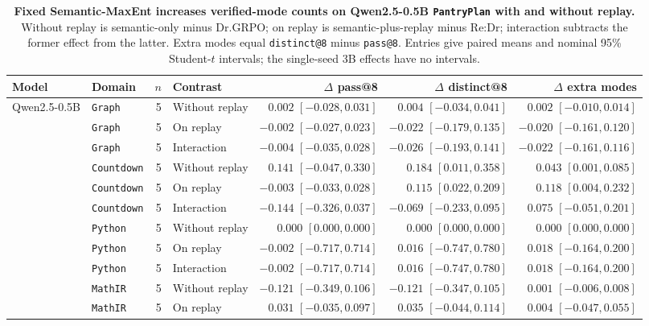 \begin{table}[!htbp]
\centering
\caption{\textbf{Fixed Semantic-MaxEnt increases verified-mode counts on Qwen2.5-0.5B \texttt{PantryPlan} with and without replay.} Without replay is semantic-only minus Dr.GRPO; on replay is semantic-plus-replay minus Re:Dr; interaction subtracts the former effect from the latter. Extra modes equal \texttt{distinct@8} minus \texttt{pass@8}. Entries give paired means and nominal 95\% Student-$t$ intervals; the single-seed 3B effects have no intervals.}
\label{tab:semantic-current}
\scriptsize
\setlength{\tabcolsep}{2.4pt}
\begin{tabular}{llr l rrr}
\toprule
Model & Domain & $n$ & Contrast & $\Delta$ pass@8 & $\Delta$ distinct@8 & $\Delta$ extra modes \\
\midrule
Qwen2.5-0.5B & \texttt{Graph} & 5 & Without replay & $0.002$ $[-0.028, 0.031]$ & $0.004$ $[-0.034, 0.041]$ & $0.002$ $[-0.010, 0.014]$ \\
 & \texttt{Graph} & 5 & On replay & $-0.002$ $[-0.027, 0.023]$ & $-0.022$ $[-0.179, 0.135]$ & $-0.020$ $[-0.161, 0.120]$ \\
 & \texttt{Graph} & 5 & Interaction & $-0.004$ $[-0.035, 0.028]$ & $-0.026$ $[-0.193, 0.141]$ & $-0.022$ $[-0.161, 0.116]$ \\
 & \texttt{Countdown} & 5 & Without replay & $0.141$ $[-0.047, 0.330]$ & $0.184$ $[0.011, 0.358]$ & $0.043$ $[0.001, 0.085]$ \\
 & \texttt{Countdown} & 5 & On replay & $-0.003$ $[-0.033, 0.028]$ & $0.115$ $[0.022, 0.209]$ & $0.118$ $[0.004, 0.232]$ \\
 & \texttt{Countdown} & 5 & Interaction & $-0.144$ $[-0.326, 0.037]$ & $-0.069$ $[-0.233, 0.095]$ & $0.075$ $[-0.051, 0.201]$ \\
 & \texttt{Python} & 5 & Without replay & $0.000$ $[0.000, 0.000]$ & $0.000$ $[0.000, 0.000]$ & $0.000$ $[0.000, 0.000]$ \\
 & \texttt{Python} & 5 & On replay & $-0.002$ $[-0.717, 0.714]$ & $0.016$ $[-0.747, 0.780]$ & $0.018$ $[-0.164, 0.200]$ \\
 & \texttt{Python} & 5 & Interaction & $-0.002$ $[-0.717, 0.714]$ & $0.016$ $[-0.747, 0.780]$ & $0.018$ $[-0.164, 0.200]$ \\
 & \texttt{MathIR} & 5 & Without replay & $-0.121$ $[-0.349, 0.106]$ & $-0.121$ $[-0.347, 0.105]$ & $0.001$ $[-0.006, 0.008]$ \\
 & \texttt{MathIR} & 5 & On replay & $0.031$ $[-0.035, 0.097]$ & $0.035$ $[-0.044, 0.114]$ & $0.004$ $[-0.047, 0.055]$ \\

\end{tabular}
\end{table}
